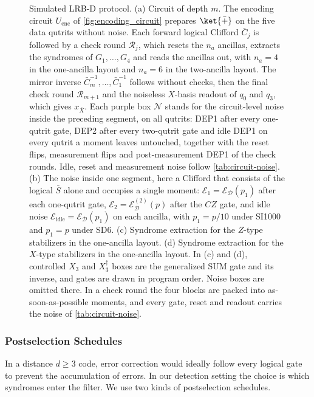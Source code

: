 \begin{figure}[H]
    \caption{Simulated LRB-D protocol. (a) Circuit of depth $m$. The encoding circuit $U_{\mathrm{enc}}$ of \autoref{fig:encoding_circuit} prepares $\ket{\bar +}$ on the five data qutrits without noise. Each forward logical Clifford $\bar C_j$ is followed by a check round $\mathcal{R}_j$, which resets the $n_a$ ancillas, extracts the syndromes of $G_1, \dots, G_4$ and reads the ancillas out, with $n_a = 4$ in the one-ancilla layout and $n_a = 6$ in the two-ancilla layout. The mirror inverse $\bar C_m^{-1}, \dots, \bar C_1^{-1}$ follows without checks, then the final check round $\mathcal{R}_{m+1}$ and the noiseless $X$-basis readout of $q_0$ and $q_3$, which gives $x_{\bar X}$. Each purple box $\mathcal{N}$ stands for the circuit-level noise inside the preceding segment, on all qutrits: DEP1 after every one-qutrit gate, DEP2 after every two-qutrit gate and idle DEP1 on every qutrit a moment leaves untouched, together with the reset flips, measurement flips and post-measurement DEP1 of the check rounds. Idle, reset and measurement noise follow \autoref{tab:circuit-noise}. (b) The noise inside one segment, here a Clifford that consists of the logical $\bar S$ alone and occupies a single moment: $\mathcal{E}_1 = \mathcal{E}_{\mathcal{D}}(p_1)$ after each one-qutrit gate, $\mathcal{E}_2 = \mathcal{E}^{(2)}_{\mathcal{D}}(p)$ after the $CZ$ gate, and idle noise $\mathcal{E}_{\mathrm{idle}} = \mathcal{E}_{\mathcal{D}}(p_1)$ on each ancilla, with $p_1 = p/10$ under SI1000 and $p_1 = p$ under SD6. (c) Syndrome extraction for the $Z$-type stabilizers in the one-ancilla layout. (d) Syndrome extraction for the $X$-type stabilizers in the one-ancilla layout. In (c) and (d), controlled $X_3$ and $X_3^{\dagger}$ boxes are the generalized SUM gate and its inverse, and gates are drawn in program order. Noise boxes are omitted there. In a check round the four blocks are packed into as-soon-as-possible moments, and every gate, reset and readout carries the noise of \autoref{tab:circuit-noise}.}
    \label{fig:lrb_d_full}
\end{figure}

\subsubsection{Postselection Schedules}
\label{subsub:postselection}
In a distance $d \ge 3$ code, error correction would ideally follow every logical gate to prevent the accumulation of errors. In our detection setting the choice is which syndromes enter the filter. We use two kinds of postselection schedules.

